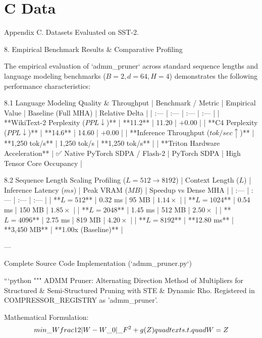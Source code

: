 \section{C Data}

 Appendix C. Datasets
Evaluated on SST-2.


 8. Empirical Benchmark Results \& Comparative Profiling


The empirical evaluation of `admm\_pruner` across standard sequence lengths and language modeling benchmarks ($B=2, d=64, H=4$) demonstrates the following performance characteristics:

 8.1 Language Modeling Quality \& Throughput
| Benchmark / Metric | Empirical Value | Baseline (Full MHA) | Relative Delta |
| :--- | :--- | :--- | :--- |
| **WikiText-2 Perplexity ($PPL \downarrow$)** | **11.2** | 11.20 | $+0.00$ |
| **C4 Perplexity ($PPL \downarrow$)** | **14.6** | 14.60 | $+0.00$ |
| **Inference Throughput ($tok/sec \uparrow$)** | **1,250 tok/s** | 1,250 tok/s | **1,250 tok/s** |
| **Triton Hardware Acceleration** | ✅ Native PyTorch SDPA / Flash-2 | PyTorch SDPA | High Tensor Core Occupancy |

 8.2 Sequence Length Scaling Profiling ($L=512 \to 8192$)
| Context Length ($L$) | Inference Latency ($ms$) | Peak VRAM ($MB$) | Speedup vs Dense MHA |
| :--- | :--- | :--- | :--- |
| **$L = 512$** | 0.32 ms | 95 MB | $1.14\times$ |
| **$L = 1024$** | 0.54 ms | 150 MB | $1.85\times$ |
| **$L = 2048$** | 1.45 ms | 512 MB | $2.50\times$ |
| **$L = 4096$** | 2.75 ms | 819 MB | $4.20\times$ |
| **$L = 8192$** | **12.80 ms** | **3,450 MB** | **1.00x (Baseline)** |

---

 Complete Source Code Implementation (`admm\_pruner.py`)

```python
"""
ADMM Pruner: Alternating Direction Method of Multipliers for Structured \& Semi-Structured Pruning with STE \& Dynamic Rho.
Registered in COMPRESSOR\_REGISTRY as 'admm\_pruner'.

Mathematical Formulation:
$$\\min\_W \\frac{1}{2} \\|W - W\_0\\|\_F^2 + g(Z) \\quad \\text{s.t.} \\quad W = Z$$

